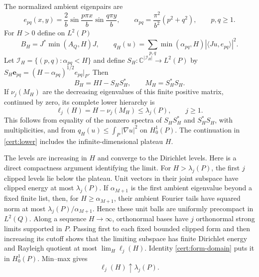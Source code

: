 \documentclass[11pt,reqno]{amsart}
\numberwithin{equation}{section}
\begin{document}
The normalized ambient eigenpairs are
\[
 e_{pq}(x,y)=\frac2b\sin\frac{p\pi x}{b}\sin\frac{q\pi y}{b},
 \qquad
 \alpha_{pq}=\frac{\pi^2}{b^2}(p^2+q^2),\qquad p,q\ge1.
\]
For $H>0$ define on $L^2(P)$
\begin{equation}\label{cert:clipped-operator}
 B_H=J^*\min(A_Q,H)J,\qquad
 q_H(u)=\sum_{p,q}\min(\alpha_{pq},H)
                 |\langle Ju,e_{pq}\rangle|^2.
\end{equation}
Let $\mathcal I_H=\{(p,q):\alpha_{pq}<H\}$ and define
$S_H:\mathbb C^{|\mathcal I_H|}\longrightarrow L^2(P)$ by
$S_H\mathbf e_{pq}=(H-\alpha_{pq})^{1/2}e_{pq}|_P$.
Then
\begin{equation}\label{cert:finite-gram}
 B_H=HI-S_HS_H^*,\qquad M_H=S_H^*S_H.
\end{equation}
If $\nu_j(M_H)$ are the decreasing eigenvalues of this finite
positive matrix, continued by zero, its complete lower hierarchy is
\begin{equation}\label{cert:lower}
 \ell_j(H)=H-\nu_j(M_H)\le\lambda_j(P),\qquad j\ge1.
\end{equation}
This follows from equality of the nonzero spectra of $S_HS_H^*$
and $S_H^*S_H$, with multiplicities, and from $q_H(u)\le
\int_P|\nabla u|^2$ on $H^1_0(P)$.  The continuation in
\eqref{cert:lower} includes the infinite-dimensional plateau $H$.

The levels are increasing in $H$ and converge to the Dirichlet
levels.  Here is a direct compactness argument identifying the
limit.  For $H>\lambda_j(P)$, the first $j$ clipped levels lie
below the plateau.  Unit vectors in their joint subspace have
clipped energy at most $\lambda_j(P)$.  If $\alpha_{M+1}$ is the
first ambient eigenvalue beyond a fixed finite list, then, for
$H\ge\alpha_{M+1}$, their ambient Fourier tails have squared norm
at most $\lambda_j(P)/\alpha_{M+1}$.  Hence these unit balls are
uniformly precompact in $L^2(Q)$.  Along a sequence $H\to\infty$,
orthonormal bases have $j$ orthonormal strong limits supported in
$P$.  Passing first to each fixed bounded clipped form and then
increasing its cutoff shows that the limiting subspace has finite
Dirichlet energy and Rayleigh quotient at most
$\lim_H\ell_j(H)$.  Identity \eqref{cert:form-domain} puts it in
$H^1_0(P)$.  Min--max gives
\begin{equation}\label{cert:lower-convergence}
 \ell_j(H)\uparrow\lambda_j(P).
\end{equation}
\end{document}
